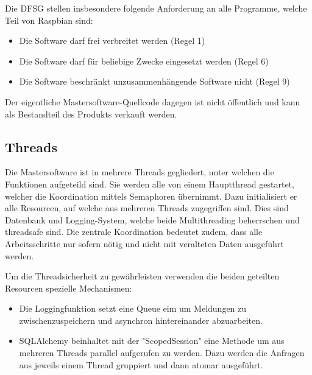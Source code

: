 Die DFSG stellen  insbesondere folgende Anforderung an  alle Programme, welche
Teil von Raspbian sind:

\begin{itemize}
    \tightlist
\item
    Die Software darf frei verbreitet werden (Regel 1)
\item
    Die Software darf f\"ur beliebige Zwecke eingesetzt werden (Regel 6)
\item
    Die Software beschr\"ankt unzusammenh\"angende Software nicht (Regel 9)
\end{itemize}

Der eigentliche  Mastersoftware-Quellcode dagegen  ist nicht  \"offentlich und
kann als Bestandteil des Produkts verkauft werden.



\subsection{Threads}
\label{subsec:software:master:threads}


Die  Mastersoftware  ist in  mehrere  Threads  gegliedert, unter  welchen  die
Funktionen aufgeteild  sind. Sie werden alle von  einem Hauptthread gestartet,
welcher die Koordination mittels Semaphoren \"ubernimmt. Dazu initialisiert er
alle  Resourcen,  auf  welche  aus  mehreren  Threads  zugegriffen  sind. Dies
sind  Datenbank und  Logging-System, welche  beide Multithreading  beherrschen
und  threadsafe  sind. Die zentrale  Koordination  bedeutet  zudem, dass  alle
Arbeitsschritte nur sofern n\"otig und nicht mit veralteten Daten ausgef\"uhrt
werden.

Um  die Threadsicherheit  zu  gew\"ahrleisten verwenden  die beiden  geteilten
Resourcen spezielle Mechanismen:
\begin{itemize}
    \tightlist
    \item
        Die   Loggingfunktion   setzt  eine   Queue   eim   um  Meldungen   zu
        zwischenzuspeichern und asynchron hintereinander abzuarbeiten.
     \item
        SQLAlchemy  beinhaltet   mit  der  "ScopedSession"  eine   Methode  um
        aus  mehreren  Threads  parallel  aufgerufen  zu  werden. Dazu  werden
        die  Anfragen  aus jeweils  einem  Thread  gruppiert und  dann  atomar
        ausgef\"uhrt.
 \end{itemize}

